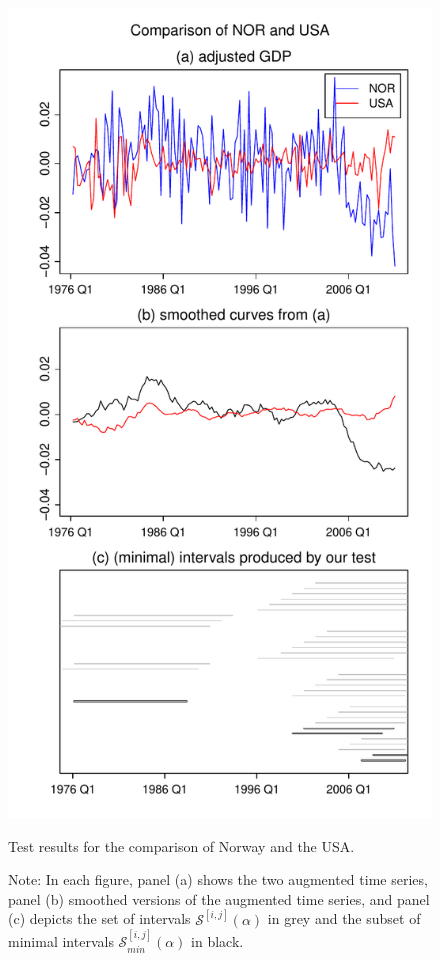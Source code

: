 \documentclass[a4paper,12pt]{article}
\begin{document}
{\begin{figure}[p!]
\begin{minipage}[t]{0.49\textwidth}
\includegraphics[width=\textwidth]{plots/NOR_vs_USA}
\caption{Test results for the comparison of Norway and the USA.}\label{fig:Norway:USA}
\end{minipage}
\caption*{Note: In each figure, panel (a) shows the two augmented time series, panel (b) smoothed versions of the augmented time series, and panel (c) depicts the set of intervals $\mathcal{S}^{[i,j]}(\alpha)$ in grey and the subset of minimal intervals $\mathcal{S}^{[i,j]}_{min}(\alpha)$ in black.}
\end{figure}


}
\end{document}
